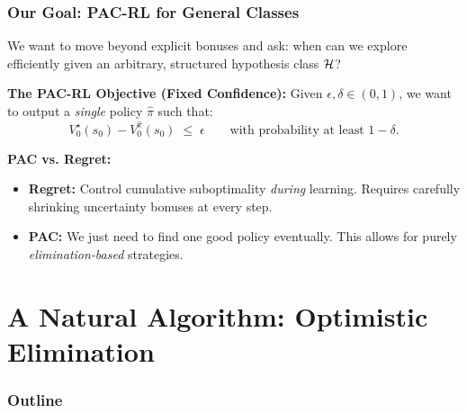 \documentclass[aspectratio=169]{beamer}
\begin{document}
\begin{frame}\frametitle{Our Goal: PAC-RL for General Classes}

We want to move beyond explicit bonuses and ask: when can we explore efficiently given an arbitrary, structured hypothesis class $\mathcal{H}$?

\vspace{0.4cm}
\pause
\textbf{The PAC-RL Objective (Fixed Confidence):}
Given $\epsilon, \delta \in (0,1)$, we want to output a \emph{single} policy $\hat{\pi}$ such that:
\[
V_0^\star(s_0) - V_0^{\hat{\pi}}(s_0) \;\le\; \epsilon \qquad \text{with probability at least } 1-\delta.
\]

\vspace{0.2cm}
\pause
\textbf{PAC vs. Regret:}
\begin{itemize}
    \item \textbf{Regret:} Control cumulative suboptimality \emph{during} learning. Requires carefully shrinking uncertainty bonuses at every step.
    \item \textbf{PAC:} We just need to find one good policy eventually. This allows for purely \emph{elimination-based} strategies. 
\end{itemize}

\end{frame}

\section{A Natural Algorithm: Optimistic Elimination}

\begin{frame}[noframenumbering]
  \frametitle{Outline}
  \tableofcontents[currentsection]
\end{frame}
\end{document}
